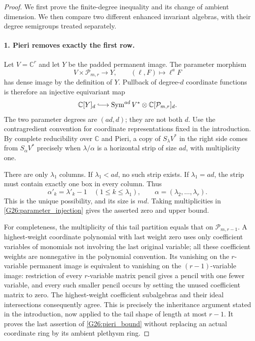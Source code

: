 \begin{proof}
We first prove the finite-degree inequality and its change of
ambient dimension. We then compare two different enhanced
invariant algebras, with their degree semigroups treated separately.

\paragraph{1. Pieri removes exactly the first row.}
Let $V=\mathbb C^r$ and let $Y$ be the padded permanent image.
The parameter morphism
\[
 V\times\mathcal P_{m,r}\longrightarrow Y,
                    \qquad(\ell,F)\longmapsto\ell^a F
\]
has dense image by the definition of $Y$. Pullback of degree-$d$
coordinate functions is therefore an injective equivariant map
\begin{equation}\label{G26:parameter_injection}
 \mathbb C[Y]_d\lhook\joinrel\longrightarrow
       \operatorname{Sym}^{ad}V^*\otimes\mathbb C[\mathcal P_{m,r}]_d.
\end{equation}
The two parameter degrees are $(ad,d)$; they are not both $d$.
Use the contragredient convention for coordinate representations
fixed in the introduction. By complete reducibility over
$\mathbb C$ and Pieri, a copy of $S_\lambda V^*$ in the right
side comes from $S_\alpha V^*$ precisely when $\lambda/\alpha$
is a horizontal strip of size $ad$, with multiplicity one.

There are only $\lambda_1$ columns. If $\lambda_1<ad$, no such
strip exists. If $\lambda_1=ad$, the strip must contain exactly
one box in every column. Thus
\[
 \alpha'_k=\lambda'_k-1\quad(1\le k\le\lambda_1),
 \qquad
                 \alpha=(\lambda_2,\ldots,\lambda_r).
\]
This is the unique possibility, and its size is $md$.
Taking multiplicities in \eqref{G26:parameter_injection} gives
the asserted zero and upper bound.

For completeness, the multiplicity of this tail partition
equals that on $\mathcal P_{m,r-1}$. A highest-weight coordinate
polynomial with last weight zero uses only coefficient variables
of monomials not involving the last original variable; all these
coefficient weights are nonnegative in the polynomial convention.
Its vanishing on the $r$-variable permanent image is equivalent
to vanishing on the $(r-1)$-variable image: restriction of every
$r$-variable matrix pencil gives a pencil with one fewer variable,
and every such smaller pencil occurs by setting the unused
coefficient matrix to zero. The highest-weight coefficient
subalgebras and their ideal intersections consequently agree.
This is precisely the inheritance argument stated in the
introduction, now applied to the tail shape of length at most
$r-1$. It proves the last assertion of
\eqref{G26:pieri_bound} without replacing an actual coordinate
ring by its ambient plethysm ring.


\end{proof}
